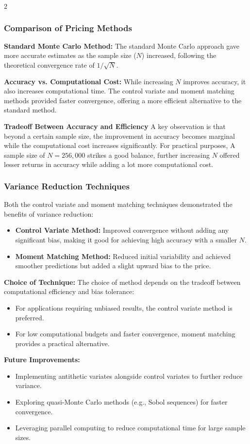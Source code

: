 \begin{multicols}{2}
\subsubsection{Comparison of Pricing Methods}
\textbf{Standard Monte Carlo Method:}  
The standard Monte Carlo approach gave more accurate estimates as the sample size (\(N\)) increased, following the theoretical convergence rate of \(1 / \sqrt{N}\).  

\textbf{Accuracy vs. Computational Cost:}  
While increasing \(N\) improves accuracy, it also increases computational time. The control variate and moment matching methods provided faster convergence, offering a more efficient alternative to the standard method.

\textbf{Tradeoff Between Accuracy and Efficiency}
A key observation is that beyond a certain sample size, the improvement in accuracy becomes marginal while the computational cost increases significantly. For practical purposes, A sample size of \(N = 256,000\) strikes a good balance, further increasing \(N\) offered lesser returns in accuracy while adding a lot more computational cost.
\subsubsection{Variance Reduction Techniques}
Both the control variate and moment matching techniques demonstrated the benefits of variance reduction:
\begin{itemize}
    \item \textbf{Control Variate Method:}  
    Improved convergence without adding any significant bias, making it good for achieving high accuracy with a smaller \(N\).
    \item \textbf{Moment Matching Method:}  
    Reduced initial variability and achieved smoother predictions but added a slight upward bias to the price.
\end{itemize}

\textbf{Choice of Technique:}  
The choice of method depends on the tradeoff between computational efficiency and bias tolerance:
\begin{itemize}
    \item For applications requiring unbiased results, the control variate method is preferred.
    \item For low computational budgets and faster convergence, moment matching provides a practical alternative.
\end{itemize}

\textbf{Future Improvements:}
\begin{itemize}
    \item Implementing antithetic variates alongside control variates to further reduce variance.
    \item Exploring quasi-Monte Carlo methods (e.g., Sobol sequences) for faster convergence.
    \item Leveraging parallel computing to reduce computational time for large sample sizes.
\end{itemize}

\end{multicols}

